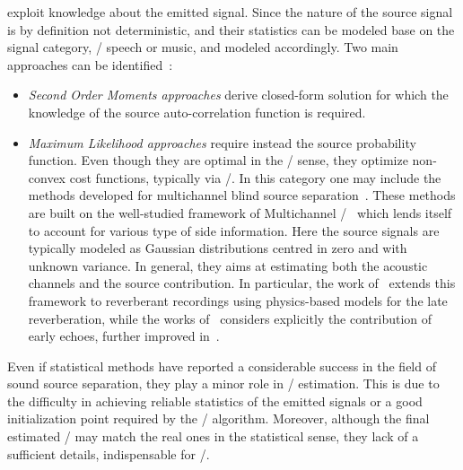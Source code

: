  exploit knowledge about the emitted signal.
Since the nature of the source signal is by definition not deterministic, and their statistics can be modeled base on the signal category, \eg/ speech or music, and modeled accordingly.
Two main approaches can be identified~:
\begin{itemize}
    \item \textit{Second Order Moments approaches} derive closed-form solution for which the knowledge of the source auto-correlation function is required.
    \item \textit{Maximum Likelihood approaches} require instead the source probability function.
    Even though they are optimal in the \ML/ sense, they optimize non-convex cost functions, typically via \EMdef/.
    In this category one may include the methods developed for multichannel blind source separation~.
    These methods are built on the well-studied framework of Multichannel \NMF/~ which lends itself to account for various type of side information.
    Here the source signals are typically modeled as Gaussian distributions centred in zero and with unknown variance.
    In general, they aims at estimating both the acoustic channels and the source contribution.
    In particular, the work of~ extends this framework to reverberant recordings using physics-based models for the late reverberation, while the works of~ considers explicitly the contribution of early echoes, further improved in~.
\end{itemize}
Even if statistical methods have reported a considerable success in the field of sound source separation, they play a minor role in \RIR/ estimation.
This is due to the difficulty in achieving reliable statistics of the emitted signals or a good initialization point required by the \EM/ algorithm.
Moreover, although the final estimated \RIRs/ may match the real ones in the statistical sense, they lack of a sufficient details, indispensable for \AER/.

